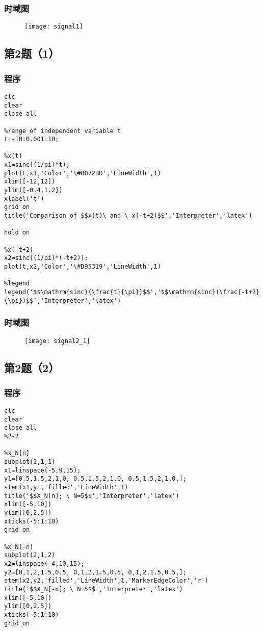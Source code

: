 \documentclass[UTF8]{ctexart}
\begin{document}
\subsubsection{时域图}
\begin{figure}[h]
\centering
\texttt{[image: signal1]}
\end{figure}

\subsection{第2题（1）}
\subsubsection{程序}
\begin{lstlisting}
clc
clear
close all

%range of independent variable t
t=-10:0.001:10;

%x(t)
x1=sinc((1/pi)*t);
plot(t,x1,'Color','\#0072BD','LineWidth',1)
xlim([-12,12])
ylim([-0.4,1.2])
xlabel('t')
grid on
title('Comparison of $$x(t)\ and \ x(-t+2)$$','Interpreter','latex')

hold on

%x(-t+2)
x2=sinc((1/pi)*(-t+2));
plot(t,x2,'Color','\#D95319','LineWidth',1)

%legend
legend('$$\mathrm{sinc}(\frac{t}{\pi})$$','$$\mathrm{sinc}(\frac{-t+2}{\pi})$$','Interpreter','latex')
\end{lstlisting}
\subsubsection{时域图}
\begin{figure}[h]
\centering
\texttt{[image: signal2\_1]}
\end{figure}

\subsection{第2题（2）}
\subsubsection{程序}
\begin{lstlisting}
clc
clear
close all
%2-2

%x_N[n]
subplot(2,1,1)
x1=linspace(-5,9,15);
y1=[0.5,1.5,2,1,0, 0.5,1.5,2,1,0, 0.5,1.5,2,1,0,];
stem(x1,y1,'filled','LineWidth',1)
title('$$X_N[n]; \ N=5$$','Interpreter','latex')
xlim([-5,10])
ylim([0,2.5])
xticks(-5:1:10)
grid on

%x_N[-n]
subplot(2,1,2)
x2=linspace(-4,10,15);
y2=[0,1,2,1.5,0.5, 0,1,2,1.5,0.5, 0,1,2,1.5,0.5,];
stem(x2,y2,'filled','LineWidth',1,'MarkerEdgeColor','r')
title('$$X_N[-n]; \ N=5$$','Interpreter','latex')
xlim([-5,10])
ylim([0,2.5])
xticks(-5:1:10)
grid on
\end{lstlisting}
\end{document}
